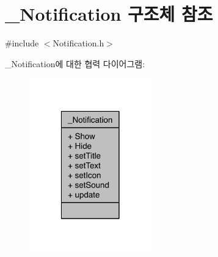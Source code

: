 \hypertarget{struct___notification}{\section{\-\_\-\-Notification 구조체 참조}
\label{struct___notification}
}


{\ttfamily \#include $<$Notification.\-h$>$}



\-\_\-\-Notification에 대한 협력 다이어그램\-:\nopagebreak
\begin{figure}[H]
\begin{center}
\leavevmode
\includegraphics[width=150pt]{d7/dca/struct___notification__coll__graph}
\end{center}
\end{figure}
